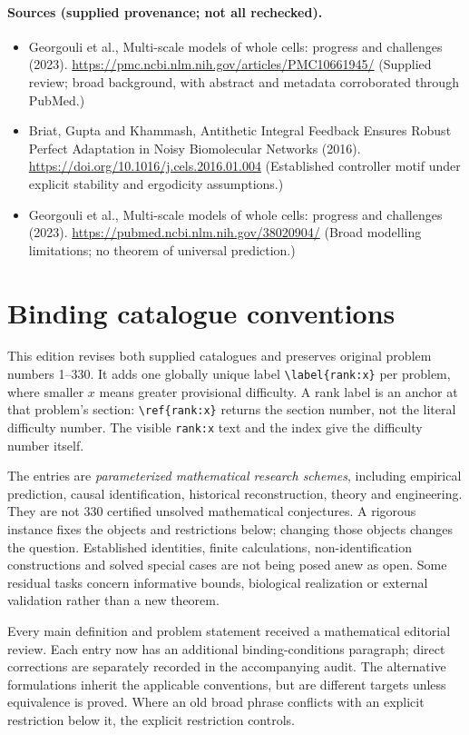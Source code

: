 \documentclass[11pt]{article}
\begin{document}
\paragraph{Sources (supplied provenance; not all rechecked).}
\begin{itemize}
\item Georgouli et al., Multi-scale models of whole cells: progress and challenges (2023). \url{https://pmc.ncbi.nlm.nih.gov/articles/PMC10661945/} (Supplied review; broad background, with abstract and metadata corroborated through PubMed.)
\item Briat, Gupta and Khammash, Antithetic Integral Feedback Ensures Robust Perfect Adaptation in Noisy Biomolecular Networks (2016). \url{https://doi.org/10.1016/j.cels.2016.01.004} (Established controller motif under explicit stability and ergodicity assumptions.)
\item Georgouli et al., Multi-scale models of whole cells: progress and challenges (2023). \url{https://pubmed.ncbi.nlm.nih.gov/38020904/} (Broad modelling limitations; no theorem of universal prediction.)
\end{itemize}


\section*{Binding catalogue conventions}
This edition revises both supplied catalogues and preserves original problem numbers 1--330. It adds one globally unique label \verb|\label{rank:x}| per problem, where smaller $x$ means greater provisional difficulty. A rank label is an anchor at that problem's section: \verb|\ref{rank:x}| returns the section number, not the literal difficulty number. The visible \texttt{rank:x} text and the index give the difficulty number itself.

The entries are \emph{parameterized mathematical research schemes}, including empirical prediction, causal identification, historical reconstruction, theory and engineering. They are not 330 certified unsolved mathematical conjectures. A rigorous instance fixes the objects and restrictions below; changing those objects changes the question. Established identities, finite calculations, non-identification constructions and solved special cases are not being posed anew as open. Some residual tasks concern informative bounds, biological realization or external validation rather than a new theorem.

Every main definition and problem statement received a mathematical editorial review. Each entry now has an additional binding-conditions paragraph; direct corrections are separately recorded in the accompanying audit. The alternative formulations inherit the applicable conventions, but are different targets unless equivalence is proved. Where an old broad phrase conflicts with an explicit restriction below it, the explicit restriction controls.
\end{document}
